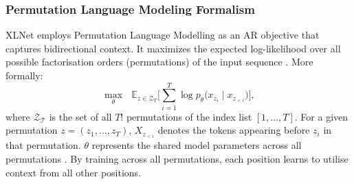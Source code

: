 \documentclass[10pt,oneside]{report}
\begin{document}
\subsubsection*{Permutation Language Modeling Formalism}
XLNet employs Permutation Language Modelling as an AR objective that captures bidirectional context. It maximizes the expected log-likelihood over all possible factorisation orders (permutations) of the input sequence \cite{yang2019xlnet}. More formally:
\begin{equation}
    \max_{\theta} \text{  } \mathbb{E}_{z\in\mathcal{Z}_T} \bigl[ \sum_{i=1}^{T} \log p_{\theta} \bigl(x_{z_i}\mid x_{z_{<i}}\bigr) \bigr], \label{eq:plm_appendix} %
\end{equation}
where $\mathcal{Z_T}$ is the set of all $T!$ permutations of the index list $[1, ... , T]$. For a given permutation $z = (z_1, ..., z_T)$, $X_{z_{<i}}$ denotes the tokens appearing before $z_i$ in that permutation. $\theta$ represents the shared model parameters across all permutations \cite{yang2019xlnet}. By training across all permutations, each position learns to utilise context from all other positions.
\end{document}
